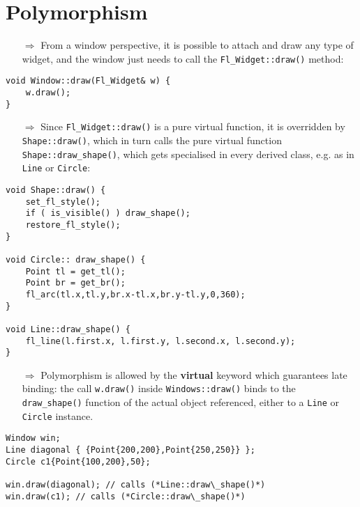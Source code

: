 \documentclass[10pt]{article}
\begin{document}
\section{Polymorphism}
\small
\begin{enumerate}
\item[$\Rightarrow$] From a window perspective, it is possible to attach and draw any type of widget, and the window just needs to call the \texttt{Fl\_Widget::draw()} method:
\end{enumerate}
\begin{lstlisting}
void Window::draw(Fl_Widget& w) {
    w.draw();
}
\end{lstlisting}
\begin{enumerate}
\item[$\Rightarrow$] Since \texttt{Fl\_Widget::draw()} is a pure virtual function, it is overridden by \texttt{Shape::draw()}, which in turn calls the pure virtual function \texttt{Shape::draw\_shape()}, which gets specialised in every derived class, e.g. as in \texttt{Line} or \texttt{Circle}:
\end{enumerate}
\begin{lstlisting}
void Shape::draw() {
    set_fl_style();
    if ( is_visible() ) draw_shape();
    restore_fl_style();
}

void Circle:: draw_shape() {
    Point tl = get_tl();
    Point br = get_br();
    fl_arc(tl.x,tl.y,br.x-tl.x,br.y-tl.y,0,360);
}

void Line::draw_shape() {
    fl_line(l.first.x, l.first.y, l.second.x, l.second.y);
}
\end{lstlisting}
\begin{enumerate}
\item[$\Rightarrow$] Polymorphism is allowed by the \textbf{virtual} keyword which guarantees late binding: the call \texttt{w.draw()} inside \texttt{Windows::draw()} binds to the \texttt{draw\_shape()} function of the actual object referenced, either to a \texttt{Line} or \texttt{Circle} instance.
\end{enumerate}
\begin{lstlisting}
Window win;
Line diagonal { {Point{200,200},Point{250,250}} };
Circle c1{Point{100,200},50};

win.draw(diagonal); // calls (*Line::draw\_shape()*)
win.draw(c1); // calls (*Circle::draw\_shape()*)
\end{lstlisting}
%
%
\end{document}
